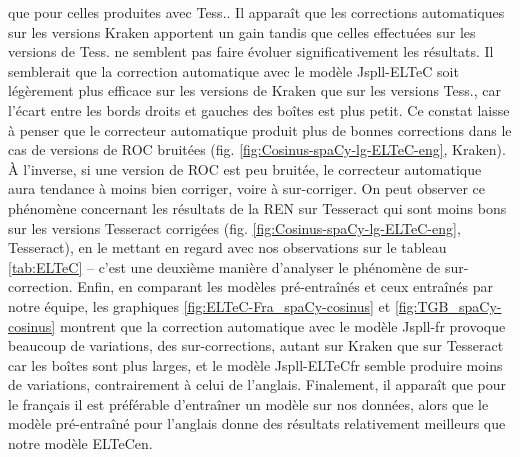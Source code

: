 que pour celles produites avec Tess.. Il apparaît 
que les corrections automatiques sur les versions Kraken apportent un gain tandis que celles effectuées sur les versions de Tess. ne semblent pas faire évoluer significativement les résultats.
Il semblerait que la correction automatique avec le modèle Jspll-ELTeC soit légèrement plus efficace sur les versions de Kraken que sur les versions Tess., car l'écart entre les bords droits et gauches des boîtes est plus petit. Ce constat laisse à penser que le correcteur automatique produit plus de bonnes corrections dans le cas de versions de ROC bruitées
(fig. \ref{fig:Cosinus-spaCy-lg-ELTeC-eng}, Kraken). À l'inverse, si une version de ROC est peu bruitée, le correcteur automatique aura tendance à moins bien corriger, voire à sur-corriger. 
On peut observer ce phénomène concernant les résultats de la REN sur Tesseract qui sont moins bons sur les versions Tesseract corrigées (fig. \ref{fig:Cosinus-spaCy-lg-ELTeC-eng}, Tesseract), 
en le mettant en regard avec nos observations sur le tableau \ref{tab:ELTeC} -- c'est une deuxième manière d'analyser le phénomène de sur-correction. 
Enfin, en comparant les modèles pré-entraînés et ceux entraînés par notre équipe,
les graphiques \ref{fig:ELTeC-Fra_spaCy-cosinus} et \ref{fig:TGB_spaCy-cosinus} montrent que la correction automatique avec le modèle Jspll-fr provoque beaucoup de variations, des sur-corrections, autant sur Kraken que sur Tesseract car les boîtes sont plus larges, et le modèle Jspll-ELTeCfr semble produire moins de variations, contrairement à celui de l'anglais. 
Finalement, il apparaît que pour le français il est préférable d'entraîner un modèle sur nos données, alors que le modèle pré-entraîné pour l'anglais donne des résultats relativement meilleurs que notre modèle ELTeCen.  




